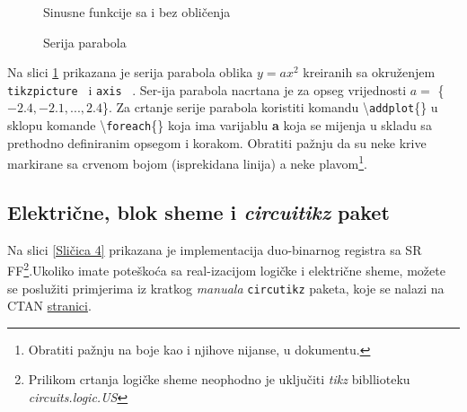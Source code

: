 \documentclass{article}
\newcommand{\plavo}[1]
{\texttt{\color{blue}#1\color{black}}~}
\begin{document}
\begin{figure}[!htb]
\begin{minipage}[b]{0.5\linewidth}\centering
{}
\caption{Sinusne funkcije sa i bez obličenja}
\label{Sličica 2}
\end{minipage}
{}
\begin{minipage}[b]{0.5\textwidth}\centering
{}
\caption{Serija parabola}
\label{Sličica 3}
\end{minipage}
\end{figure}

\vspace{5mm}
Na slici \ref{Sličica 3} prikazana je serija parabola oblika $y = ax^2$ kreiranih sa okruženjem \plavo{tikzpicture} i \plavo{axis} . Ser-ija parabola nacrtana je za opseg vrijednosti $a =$ \{$−2.4, −2.1, ..., 2.4$\}. Za crtanje serije parabola koristiti komandu \color{mycolor1}\textbackslash{}\texttt{addplot}\color{black}\{\} u sklopu komande \color{mycolor1}\textbackslash{}\texttt{foreach}\color{black}\{\} koja ima varijablu \textbf{a} koja se mijenja u skladu sa prethodno definiranim opsegom i korakom. Obratiti pažnju da su neke krive markirane sa crvenom bojom (isprekidana linija) a neke plavom\footnote[6]{Obratiti pažnju na boje kao i njihove nijanse, u dokumentu.}.

\subsection{Električne, blok sheme i {\color{mycolor1}\textsl{circuitikz}} paket}
Na slici \ref{Sličica 4} prikazana je implementacija duo-binarnog registra sa SR FF\footnote[7]{Prilikom crtanja logičke sheme neophodno je uključiti \textit{tikz} bibllioteku \textit{circuits.logic.US} \vspace{35mm}}.\space Ukoliko imate poteškoća sa real-izacijom logičke i električne sheme, možete se poslužiti primjerima iz kratkog \textsl{manuala} \texttt{circutikz} paketa, koje se nalazi na CTAN \href{http://texdoc.net/texmf-dist/doc/latex/circuitikz/circuitikzmanual.pdf}{\color{cyan}stranici}.
\end{document}
